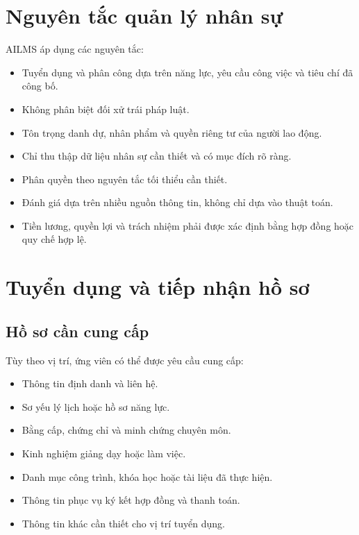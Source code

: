 \documentclass[12pt,a4paper]{article}
\begin{document}
\section{Nguyên tắc quản lý nhân sự}

AILMS áp dụng các nguyên tắc:

\begin{itemize}
    \item Tuyển dụng và phân công dựa trên năng lực, yêu cầu công việc
    và tiêu chí đã công bố.
    \item Không phân biệt đối xử trái pháp luật.
    \item Tôn trọng danh dự, nhân phẩm và quyền riêng tư của người lao động.
    \item Chỉ thu thập dữ liệu nhân sự cần thiết và có mục đích rõ ràng.
    \item Phân quyền theo nguyên tắc tối thiểu cần thiết.
    \item Đánh giá dựa trên nhiều nguồn thông tin, không chỉ dựa vào thuật toán.
    \item Tiền lương, quyền lợi và trách nhiệm phải được xác định bằng
    hợp đồng hoặc quy chế hợp lệ.
\end{itemize}

\section{Tuyển dụng và tiếp nhận hồ sơ}

\subsection{Hồ sơ cần cung cấp}

Tùy theo vị trí, ứng viên có thể được yêu cầu cung cấp:

\begin{itemize}
    \item Thông tin định danh và liên hệ.
    \item Sơ yếu lý lịch hoặc hồ sơ năng lực.
    \item Bằng cấp, chứng chỉ và minh chứng chuyên môn.
    \item Kinh nghiệm giảng dạy hoặc làm việc.
    \item Danh mục công trình, khóa học hoặc tài liệu đã thực hiện.
    \item Thông tin phục vụ ký kết hợp đồng và thanh toán.
    \item Thông tin khác cần thiết cho vị trí tuyển dụng.
\end{itemize}
\end{document}
